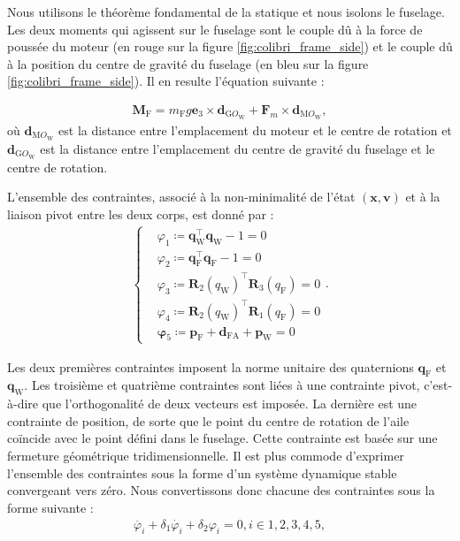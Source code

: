Nous utilisons le théorème fondamental de la statique et nous isolons le fuselage. Les deux moments qui agissent sur le fuselage sont le couple dû à la force de poussée du moteur (en rouge sur la figure \eqref{fig:colibri_frame_side}) et le couple dû à la position du centre de gravité du fuselage (en bleu sur la figure \eqref{fig:colibri_frame_side}). Il en resulte l'équation suivante :

\begin{align}
    \label{eq:momentfuselage}
    \boldsymbol{M}_{\text{F}} =  m_{\text{F}} g \boldsymbol{e}_3 \times \boldsymbol{d}_{\text{G}O_{\text{W}}} + \boldsymbol{F}_{m} \times \boldsymbol{d}_{\text{M}O_{\text{W}}},
\end{align}
où $\boldsymbol{d}_{\text{M}O_{\text{W}}}$ est la distance entre l'emplacement du moteur et le centre de rotation et $\boldsymbol{d}_{\text{G}O_{\text{W}}}$ est la distance entre l'emplacement du centre de gravité du fuselage et le centre de rotation.


L'ensemble des contraintes, associé à la non-minimalité de l'état $(\boldsymbol{x},\boldsymbol{v})$ et à la liaison pivot entre les deux corps, est donné par :
\begin{align}
    \label{eq:contraintes}
    \left\{
    \begin{aligned}
    &\varphi_{1} \coloneqq \boldsymbol{q}_{\text{W}}^\top \boldsymbol{q}_{\text{W}} - 1 = 0\\
    &\varphi_{2} \coloneqq \boldsymbol{q}_{\text{F}}^\top \boldsymbol{q}_{\text{F}} - 1 = 0\\
    &\varphi_{3} \coloneqq \boldsymbol{R}_{2}(q_{\text{W}})^\top \boldsymbol{R}_{3}(q_{\text{F}}) = 0\\
    &\varphi_{4} \coloneqq \boldsymbol{R}_{2}(q_{\text{W}})^\top \boldsymbol{R}_{1}(q_{\text{F}}) = 0\\
    &\boldsymbol{\varphi}_{5} \coloneqq \boldsymbol{p}_{\text{F}} + \boldsymbol{d}_{\text{FA}} + \boldsymbol{p}_{\text{W}} = 0
    \end{aligned}.
    \right.
\end{align}

Les deux premières contraintes imposent la norme unitaire des quaternions $\boldsymbol{q}_{\text{F}}$ et $\boldsymbol{q}_{\text{W}}$.
Les troisième et quatrième contraintes sont liées à une contrainte pivot, c'est-à-dire que l'orthogonalité de deux vecteurs est imposée. La dernière est une contrainte de position, de sorte que le point du centre de rotation de l'aile coïncide avec le point défini dans le fuselage. Cette contrainte est basée sur une fermeture géométrique tridimensionnelle.
Il est plus commode d'exprimer l'ensemble des contraintes sous la forme d'un système dynamique stable convergeant vers zéro. Nous convertissons donc chacune des contraintes sous la forme suivante :
\begin{align}
    \ddot{\varphi_{i}} + \delta_{1} \dot{\varphi_{i}}  + \delta_{2} \varphi_{i} = 0, i \in {1,2,3,4,5},
\end{align}

